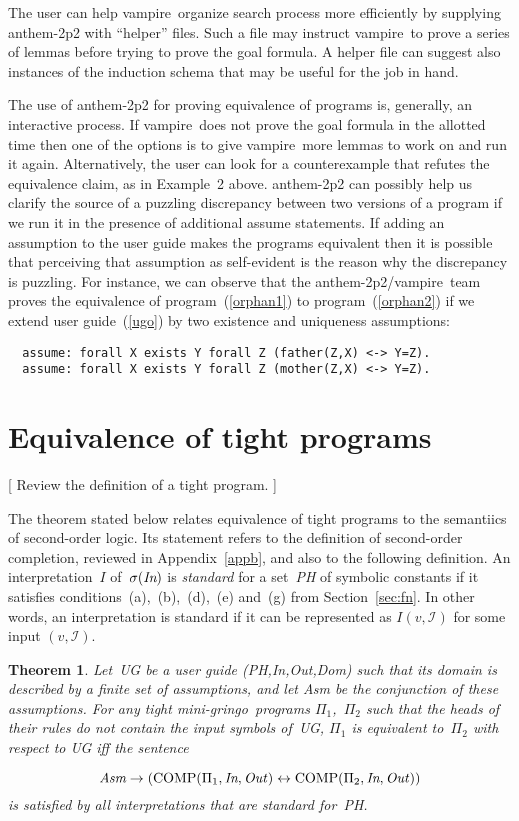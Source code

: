 \documentclass{article}
\newtheorem{thm}{Theorem}
\def\lrar{\leftrightarrow}
\def\beq{\begin{equation}}
\def\eeq#1{\label{#1}\end{equation}}
\def\gringo{{\sc gringo}}
\def\vampire{{\sc vampire}}
\newcommand{\I}{\mathcal{I}}
\begin{document}
The user can help \vampire\ organize search process more efficiently by
supplying {\sc anthem-2p2} with ``helper'' files.  Such a file may instruct
\vampire\ to prove a series of lemmas before trying to prove the goal formula.
A helper file can suggest also instances of the induction schema that may be
useful for the job in hand.

The use of {\sc anthem-2p2} for proving
equivalence of programs is, generally, an interactive process.
If \vampire\ does not prove the goal formula in the allotted time then one of
the options is to give \vampire\ more lemmas to work on and run it
again.  Alternatively, the user can look for a counterexample that refutes the
equivalence claim, as in Example~2 above.  {\sc anthem-2p2} can possibly
help us clarify the source of a puzzling discrepancy between two versions
of a program if we run it in the presence of additional assume statements.  If
adding an assumption to the user guide makes the programs equivalent then
it is possible that perceiving that assumption as self-evident
is the reason why the discrepancy is puzzling.  For
instance, we can observe that
the {\sc anthem-2p2}/\vampire\ team
proves the equivalence of
program~(\ref{orphan1}) to program~(\ref{orphan2}) if we extend user
guide~(\ref{ugo}) by two existence and uniqueness assumptions:
\begin{verbatim}
  assume: forall X exists Y forall Z (father(Z,X) <-> Y=Z).
  assume: forall X exists Y forall Z (mother(Z,X) <-> Y=Z).
\end{verbatim}

\section{Equivalence of tight programs}\label{sec:tight}

[ Review the definition of a tight program. ]
\bigskip

The theorem stated below relates equivalence of tight programs to the
semantiics of second-order logic.  Its statement refers to
the definition of second-order completion, reviewed in Appendix~\ref{appb},
and also to the following definition.
An interpretation~$I$ of~$\sigma(\emph{In})$ is \emph{standard} for a
set~\emph{PH} of symbolic constants if it
satisfies conditions~(a),~(b),~(d),~(e) and~(g)
from Section~\ref{sec:fn}.  In other words, an interpretation
is standard if it can be represented as $I(v,\I)$ for some input
$(v,\I)$.

\begin{thm}\label{thm1}
  Let~UG be a user guide (PH,In,Out,Dom) such that its domain is described by
  a finite set of assumptions, and let Asm be the conjunction of these
  assumptions.
  For any tight mini-\gringo\ programs $\Pi_1$,~$\Pi_2$ such that the
  heads of their rules do not contain the input symbols of~UG,
$\Pi_1$ is equivalent to~$\Pi_2$ with respect to UG iff the sentence
\end{thm}
\beq
\emph{Asm}\to(\hbox{COMP}(\Pi_1,\emph{In},\emph{Out\/}) \lrar
\hbox{COMP}(\Pi_2,\emph{In},\emph{Out\/}))
\eeq{thmf}
\emph{is satisfied by all interpretations that are standard for~PH.}
\medskip
\end{document}
